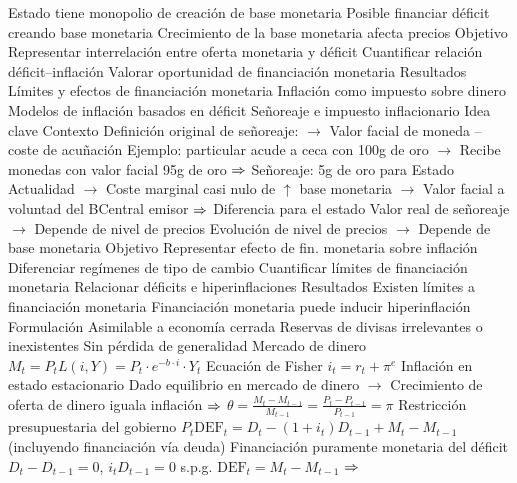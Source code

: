 \documentclass{nuevotema}
\begin{document}
\begin{esquemal}
				\4 Estado tiene monopolio de creación de base monetaria
				\4 Posible financiar déficit creando base monetaria
				\4 Crecimiento de la base monetaria afecta precios
			\3 Objetivo
				\4 Representar interrelación entre oferta monetaria y déficit
				\4 Cuantificar relación déficit--inflación
				\4 Valorar oportunidad de financiación monetaria
			\3 Resultados
				\4 Límites y efectos de financiación monetaria
				\4 Inflación como impuesto sobre dinero
				\4 Modelos de inflación basados en déficit
		\2 Señoreaje e impuesto inflacionario
			\3 Idea clave
				\4 Contexto
				\4[] Definición original de señoreaje:
				\4[] $\to$ Valor facial de moneda -- coste de acuñación
				\4[] Ejemplo: particular acude a ceca con 100g de oro
				\4[] $\to$ Recibe monedas con valor facial 95g de oro
				\4[] $\Rightarrow$ Señoreaje: 5g de oro para Estado
				\4[] Actualidad
				\4[] $\to$ Coste marginal casi nulo de $\uparrow$ base monetaria
				\4[] $\to$ Valor facial a voluntad del BCentral emisor
				\4[] $\Rightarrow$ Diferencia para el estado
				\4[] Valor real de señoreaje
				\4[] $\to$ Depende de nivel de precios
				\4[] Evolución de nivel de precios
				\4[] $\to$ Depende de base monetaria
				\4 Objetivo
				\4[] Representar efecto de fin. monetaria sobre inflación
				\4[] Diferenciar regímenes de tipo de cambio
				\4[] Cuantificar límites de financiación monetaria
				\4[] Relacionar déficits e hiperinflaciones
				\4 Resultados
				\4[] Existen límites a financiación monetaria
				\4[] Financiación monetaria puede inducir hiperinflación
			\3 Formulación
				\4 Asimilable a economía cerrada
				\4[] Reservas de divisas irrelevantes o inexistentes
				\4[] Sin pérdida de generalidad
				\4 Mercado de dinero
				\4[] $M_t = P_t L(i,Y) = P_t \cdot e^{-b \cdot i} \cdot Y_t$
				\4 Ecuación de Fisher
				\4[] $i_t = r_t + \pi^e$
				\4 Inflación en estado estacionario
				\4[] Dado equilibrio en mercado de dinero
				\4[] $\to$ Crecimiento de oferta de dinero iguala inflación
				\4[] $\Rightarrow$ $\theta = \frac{M_t - M_{t-1}}{M_{t-1}} = \frac{P_t - P_{t-1}}{P_{t-1}} = \pi$
				\4 Restricción presupuestaria del gobierno
				\4[] $P_t \text{DEF}_t = D_t - (1+i_t)D_{t-1} + M_t - M_{t-1}$
				\4[] (incluyendo financiación vía deuda)
				\4 Financiación puramente monetaria del déficit
				\4[] $D_t - D_{t-1} = 0$, $i_t D_{t-1}=0$ s.p.g.
				\4[] $\text{DEF}_t = M_t - M_{t-1}$
				\4[] $\Rightarrow$ 

\end{esquemal}
\end{document}
